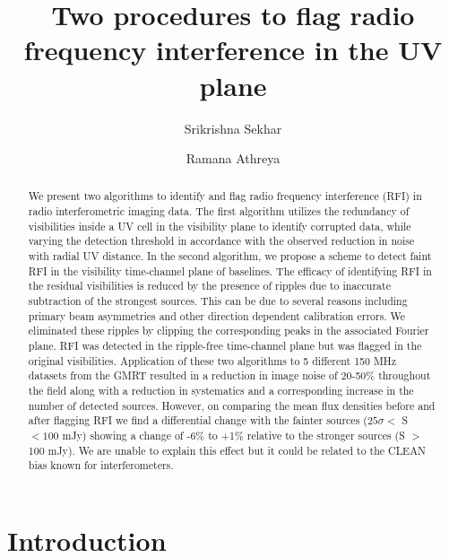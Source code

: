 \documentclass[twocolumn]{aastex61}
\begin{document}
\title{Two procedures to flag radio frequency interference in the UV plane}

\author{Srikrishna Sekhar}

\author{Ramana Athreya}

\begin{abstract}

   We present two algorithms to identify and flag radio frequency interference
   (RFI) in radio interferometric imaging data. The first algorithm utilizes the
   redundancy of visibilities inside a UV cell in the visibility plane to identify
   corrupted data, while varying the detection threshold in accordance with the
   observed reduction in noise with radial UV distance.  In the second algorithm,
   we propose a scheme to detect faint RFI in the visibility time-channel plane of
   baselines. The efficacy of identifying RFI in the residual visibilities is
   reduced by the presence of ripples due to inaccurate subtraction of the
   strongest sources. This can be due to several reasons including primary beam
   asymmetries and other direction dependent calibration errors. We eliminated
   these ripples by clipping the corresponding peaks in the associated Fourier
   plane. RFI was detected in the ripple-free time-channel plane but was flagged
   in the original visibilities. Application of these two algorithms to 5
   different 150 MHz datasets from the GMRT resulted in a reduction in image noise
   of 20-50\% throughout the field along with a reduction in systematics and a
   corresponding increase in the number of detected sources.  However, on
   comparing the mean flux densities before and after flagging RFI we find a
   differential change with the fainter sources ($25\sigma <$ S $< 100$ mJy)
   showing a change of -6\% to +1\% relative to the stronger sources (S $>$ 100
   mJy).  We are unable to explain this effect but it could be related to the
   CLEAN bias known for interferometers.

\end{abstract}


\section{Introduction} \label{sec:intro}
\end{document}
